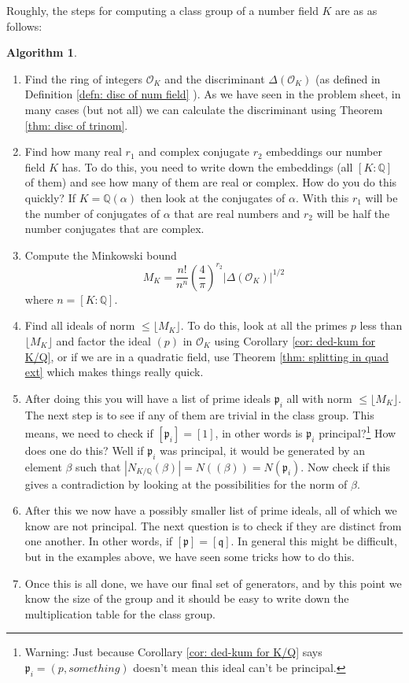 \documentclass[11pt,a4paper]{report}
\theoremstyle{plain}
\theoremstyle{definition}
\theoremstyle{definition}
\newtheorem{alg}[subsection]{Algorithm}
\def\QQ{\mathbb{Q}}
\def\gothp{\mathfrak{p}}
\def\gothq{\mathfrak{q}}
\def \a{\alpha}
\def \OO {\mathcal{O}}
\begin{document}
Roughly, the steps for computing a class group of a number field $K$ are as as follows:

\begin{alg}
	
	
	\begin{enumerate}
		\item Find the ring of integers $\OO_K$ and the discriminant $\Delta(\OO_K)$ (as defined in Definition \ref{defn: disc of num field} ). As we have seen in the problem sheet, in many cases (but not all) we can calculate the discriminant using Theorem \ref{thm: disc of trinom}.
		
		\item Find how many real $r_1$ and complex conjugate $r_2$ embeddings our number field $K$ has. To do this, you need to write down the embeddings (all $[K:\QQ]$ of them) and see how many of them are real or complex. How do you do this quickly? If $K=\QQ(\a)$ then look at the conjugates of $\a$. With this $r_1$ will be the number of conjugates of $\a$  that are real numbers and $r_2$ will be half  the number conjugates that are complex.
		
		\item Compute the Minkowski bound \[M_K= \frac{n!}{n^n} \left( \frac{4}{\pi} \right)^{r_2} |\Delta(\OO_K)|^{1/2}\] where $n=[K:\QQ]$.
		
		
		\item Find all ideals of norm $\leq \lfloor M_K \rfloor$. To do this, look at all the primes $p$ less than $\lfloor M_K \rfloor$ and factor the ideal $(p)$ in $\OO_K$ using Corollary \ref{cor: ded-kum for K/Q}, or if we are in a quadratic field, use Theorem \ref{thm: splitting in quad ext} which makes things really quick.
		
		\item After doing this you will have a list of prime ideals $\gothp_i$ all with norm $\leq \lfloor M_K \rfloor$. The next step is to see if any of them are trivial in the class group. This means, we need to check if $[\gothp_i]=[1]$, in other words is $\gothp_i$ principal?\footnote{Warning: Just because Corollary \ref{cor: ded-kum for K/Q} says $\gothp_i=(p,something)$ doesn't mean this ideal can't be principal.} How does one do this? Well if $\gothp_i$ was principal, it would be generated by an element $\beta$ such that $|N_{K/\QQ}(\beta)|=N((\beta))=N(\gothp_i)$. Now check if this gives a contradiction by looking at the possibilities for the norm of $\beta$.
		
		\item After this we now have a possibly smaller list of prime ideals, all of which we know are not principal. The next question is to check if they are distinct from one another. In other words, if $[\gothp]=[\gothq]$. In general this might be difficult, but in the examples above, we have seen some tricks how to do this.
		
		\item Once this is all done, we have our final set of generators, and by this point we know the size of the group and it should be easy to write down the multiplication table for the class group.
		
	\end{enumerate}
\end{alg}
\end{document}
